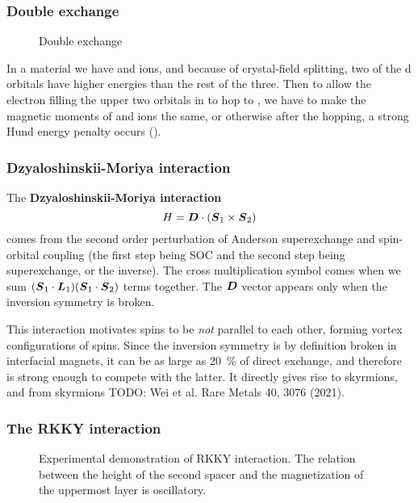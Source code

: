 \documentclass[hyperref, a4paper]{article}
\newcommand*{\concept}[1]{{\textbf{#1}}}
\begin{document}
\subsubsection{Double exchange}

\begin{figure}
    \centering
    
    \caption{Double exchange}
    \label{fig:double-exchange}
\end{figure}

In a material we have  and  ions,
and because of crystal-field splitting, 
two of the d orbitals have higher energies than the rest of the three. 
Then to allow the electron filling the upper two orbitals in 
to hop to ,
we have to make the magnetic moments of  and  ions the same, 
or otherwise after the hopping, 
a strong Hund energy penalty occurs
(). 

\subsubsection{Dzyaloshinskii-Moriya interaction}

The \concept{Dzyaloshinskii-Moriya interaction} 
\begin{equation}
    H = \vb*{D} \cdot (\vb*{S}_1 \times \vb*{S}_2)
\end{equation}
comes from 
the second order perturbation 
of Anderson superexchange and spin-orbital coupling
(the first step being SOC and the second step being superexchange,
or the inverse). 
The cross multiplication symbol comes 
when we sum $(\vb*{S}_1 \cdot \vb*{L}_1) (\vb*{S}_1 \cdot \vb*{S}_2)$ terms together.
The $\vb*{D}$ vector appears only when the inversion symmetry is broken. 

This interaction motivates 
spins to be \emph{not} parallel to each other, 
forming vortex configurations of spins. 
Since the inversion symmetry is by definition broken 
in interfacial magnets, 
it can be as large as \SI{20}{\percent} of direct exchange,
and therefore is strong enough to compete with the latter. 
It directly gives rise to skyrmions, 
and from skyrmions TODO: Wei et al. Rare Metals 40, 3076 (2021).

\subsubsection{The RKKY interaction}

\begin{figure}
    \centering
    
    \caption{Experimental demonstration of RKKY interaction. 
    The relation between the height of the second spacer 
    and the magnetization of the uppermost layer is oscillatory.}
    \label{fig:rkky-experiment}
\end{figure}
\end{document}
